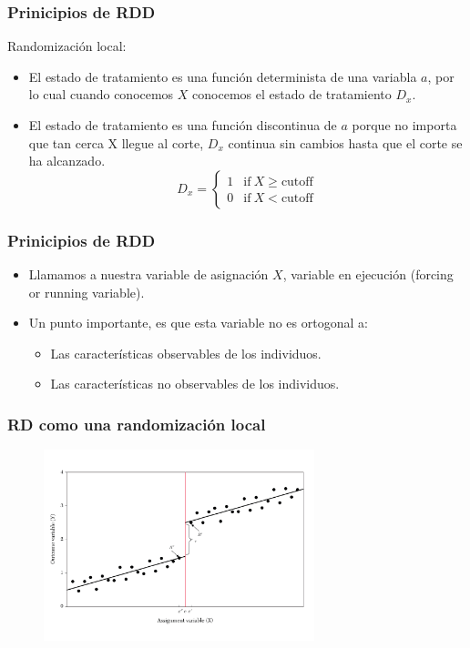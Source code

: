 \documentclass[10pt, aspectratio=169, compress]{beamer}
\begin{document}
\begin{frame}
	\frametitle{Prinicipios de RDD}

	Randomización local: 

	\begin{itemize}
		\item El estado de tratamiento es una función determinista de una variabla $a$, por lo cual cuando conocemos $X$ conocemos el estado de tratamiento $D_x$. 
		\item El estado de tratamiento es una función discontinua de $a$ porque no importa que tan cerca X llegue al corte, $D_x$ continua sin cambios hasta que el corte se ha alcanzado.
		$$
		D_x = 
		\begin{cases}
		1 &\text{if}~X \geq \text{cutoff} \\  
		0 &\text{if}~X < \text{cutoff} 
		\end{cases}
		$$
	\end{itemize}

\end{frame}
\begin{frame}
	\frametitle{Prinicipios de RDD}

	\begin{itemize}
		\item Llamamos a nuestra variable de asignación $X$, variable en ejecución (forcing or running variable).
		\item Un punto importante, es que esta variable no es ortogonal a:
		\begin{itemize}
			\item Las características observables de los individuos. 
			\item Las características no observables de los individuos.
		\end{itemize}
	\end{itemize}
	

\end{frame}
\begin{frame}
	\frametitle{RD como una randomización local}

	\begin{figure}
		\centering
		\includegraphics[width=0.7\textwidth]{rdd.pdf}
	\end{figure}

\end{frame}
\end{document}
